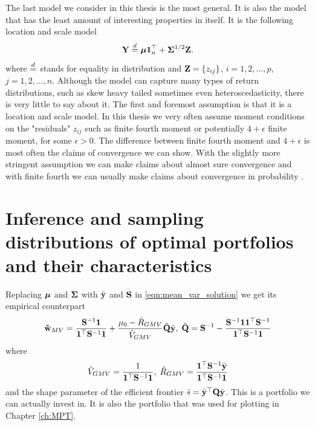 \documentclass[oneside]{book}\usepackage{knitr}
\begin{document}
% 
The last model we consider in this thesis is the most general.
It is also the model that has the least amount of interesting properties in itself.
It is the following location and scale model
\begin{equation}\label{eqn:location_scale_model}
\mathbf{Y} \stackrel{d}{=} \mbox{\boldmath$\mu$} \mathbf{1}^\top_n + \mathbf{\Sigma}^{1/2} \mathbf{Z}.
\end{equation}
where $\stackrel{d}{=}$ stands for equality in distribution and $\mathbf{Z} = \{z_{ij}\}$, $i=1,2,...,p$, $j=1,2,...,n$.
Although the model can capture many types of return distributions, such as skew heavy tailed sometimes even heteroscedasticity, there is very little to say about it.
The first and foremost assumption is that it is a location and scale model.
In this thesis we very often assume moment conditions on the "residuals" $z_{ij}$ such as finite fourth moment or potentially $4+\epsilon$ finite moment, for some $\epsilon>0$.
The difference between finite fourth moment and $4+\epsilon$ is most often the claims of convergence we can show.
With the slightly more stringent assumption we can make claims about almost sure convergence and with finite fourth we can usually make claims about convergence in probability \citet{REF}.

\section{Inference and sampling distributions of optimal portfolios and their characteristics}
Replacing $\mbox{\boldmath$\mu$}$ and $\mathbf{\Sigma}$ with $\bar{\mathbf{y}}$ and $\mathbf{S}$ in \eqref{eqn:mean_var_solution} we get its empirical counterpart
\begin{equation}\label{eqn:meanvar_solution_sample}
	\mathbf{\hat{w}}_{MV} = \frac{\mathbf{S}^{-1}\mathbf{1}}{\mathbf{1}^\top \mathbf{S}^{-1}\mathbf{1}} + \frac{\mu_0 - \hat{R}_{GMV}}{\hat{V}_{GMV}} \hat{\mathbf{Q}} \bar{\mathbf{y}},\; \hat{\mathbf{Q}} = \mathbf{S}^{-1} - \frac{\mathbf{S}^{-1} \mathbf{1} \mathbf{1}^\top \mathbf{S}^{-1}}{\mathbf{1}^\top \mathbf{S}^{-1} \mathbf{1}}
\end{equation}
where 
\begin{equation}\label{eqn:meanvar_characteristics_sample}
  \hat{V}_{GMV} = \frac{1}{\mathbf{1}^\top \mathbf{S}^{-1}\mathbf{1}},\; \hat{R}_{GMV} = \frac{\mathbf{1}^\top \mathbf{S}^{-1} \bar{\mathbf{y}}}{\mathbf{1}^\top \mathbf{S}^{-1}\mathbf{1}}
\end{equation}
and the shape parameter of the efficient frontier $\hat{s} = \bar{\mathbf{y}}^\top \mathbf{Q} \bar{\mathbf{y}}$.
This is a portfolio we can actually invest in. 
It is also the portfolio that was used for plotting in Chapter \ref{ch:MPT}.
\end{document}
